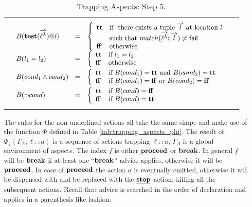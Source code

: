 \documentclass[a4paper]{llncs}
\makeatletter
\newcommand{\Test}[2]{{\bf test}({#1})@{\it #2}}
\newcommand{\YZl}{l}
\newcommand{\Fail}{{\sf fail}}
\newcommand{\Lbt}{\ell^\lambda}
\newcommand{\veck}[1]{\overrightarrow{#1}}
\newcommand{\TT}{{\bf tt}}
\newcommand{\FF}{{\bf ff}}
\newenvironment{ARRAY}[1]{%
  \begin{tabular*}{\textwidth}{@{\extracolsep{\fill}}c@{}c@{}c}
  \hline
  &&\\[-5pt]
  &\begin{math}\begin{array}{@{} #1 @{}}
}
{ \end{array}\end{math}&\\
  &&\\[-5pt]
  \hline
  \end{tabular*}
}
\makeatother
\begin{document}
\begin{table}[h]
\center
\begin{ARRAY}{lll}
    B(\Test{\veck{\Lbt}}{l}) &=& \left\{
    \begin{array}{ll}
    \TT & \textrm{if } \textrm{ there exists a tuple } \veck{l} \textrm{ at location } l \\
        & \textrm{such that } match(\veck{\Lbt}; \veck{l})\neq \Fail\\
    \FF & \textrm{otherwise}
    \end{array}
    \right.


\\[2ex]
    B(\YZl_1 = \YZl_2) &=& \left\{
    \begin{array}{ll}
    \TT & \textrm{if } \YZl_1 = \YZl_2\\
    \FF & \textrm{otherwise}
    \end{array}
    \right.

\\[2ex]
    B(cond_1\land cond_2) &=& \left\{
    \begin{array}{ll}
    \TT & \textrm{if } B(cond_1)=\TT \textrm{ and } B(cond_2)=\TT \\
    \FF & \textrm{if } B(cond_1)=\FF \textrm{ or } B(cond_2)=\FF \\
    \end{array}
    \right.

\\[2ex]
     B(\neg cond)  &=& \left\{
    \begin{array}{ll}
    \TT & \textrm{if } B(cond)=\FF\\
    \FF & \textrm{if } B(cond)=\TT\\
    \end{array}
    \right.
\end{ARRAY}
 \caption{Trapping Aspects: Step $5$.} \label{tab:trapping_aspects_B}
\end{table}

The rules for the non-underlined actions all take the same shape and
make use of the function %
$\Phi$ defined in Table
\ref{tab:trapping_aspects_phi}. The result of
$\Phi_{f}(\Gamma_A; \ell ::a)$ is a sequence of
actions trapping $\ell ::a$; $\Gamma_A$ is a global environment of aspects. 
The index $f$ is either ${\bf
proceed}$ or ${\bf break}$. In general $f$ will be ${\bf break}$ if
at least one ``${\bf break}$'' advice applies, otherwise it will be
${\bf proceed}$. In case of ${\bf proceed}$ the action
$\underline{a}$ is eventually emitted, otherwise it will be
dispensed with and be replaced with the $\underline{\bf stop}$
action, %
killing all the subsequent actions. Recall that advice is searched in
the order of declaration and applies in a parenthesis-like fashion.
\end{document}
